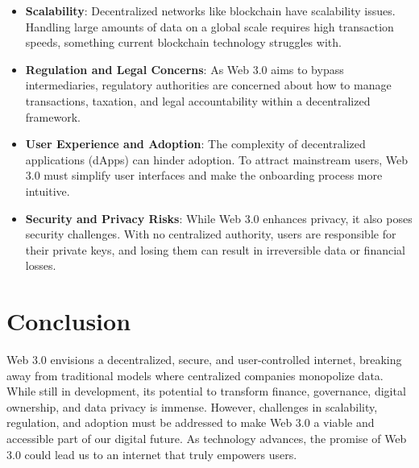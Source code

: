 \documentclass[12pt]{article}
\begin{document}
\begin{itemize}
    \item \textbf{Scalability}: Decentralized networks like blockchain have scalability issues. Handling large amounts of data on a global scale requires high transaction speeds, something current blockchain technology struggles with.
    \item \textbf{Regulation and Legal Concerns}: As Web 3.0 aims to bypass intermediaries, regulatory authorities are concerned about how to manage transactions, taxation, and legal accountability within a decentralized framework.
    \item \textbf{User Experience and Adoption}: The complexity of decentralized applications (dApps) can hinder adoption. To attract mainstream users, Web 3.0 must simplify user interfaces and make the onboarding process more intuitive.
    \item \textbf{Security and Privacy Risks}: While Web 3.0 enhances privacy, it also poses security challenges. With no centralized authority, users are responsible for their private keys, and losing them can result in irreversible data or financial losses.
\end{itemize}

\section{Conclusion}
Web 3.0 envisions a decentralized, secure, and user-controlled internet, breaking away from traditional models where centralized companies monopolize data. While still in development, its potential to transform finance, governance, digital ownership, and data privacy is immense. However, challenges in scalability, regulation, and adoption must be addressed to make Web 3.0 a viable and accessible part of our digital future. As technology advances, the promise of Web 3.0 could lead us to an internet that truly empowers users.
\end{document}

